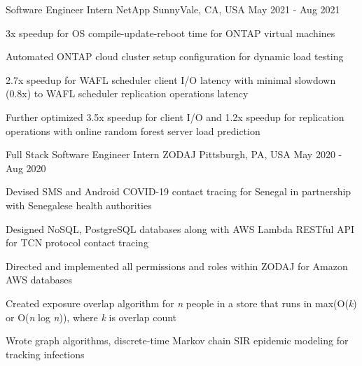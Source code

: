 

\begin{cventries}

  \cventry
    {Software Engineer Intern} %
    {NetApp} %
    {SunnyVale, CA, USA} %
    {May 2021 - Aug 2021} %
    {
      \begin{cvitems} %
        \item {3x speedup for OS compile-update-reboot time for ONTAP virtual machines}
        \item {Automated ONTAP cloud cluster setup configuration for dynamic load testing}
        \item {2.7x speedup for WAFL scheduler client I/O latency with minimal slowdown (0.8x) to WAFL scheduler replication operations latency}
        \item {Further optimized 3.5x speedup for client I/O and 1.2x speedup for replication operations with online random forest server load prediction}
      \end{cvitems}
    }

  \cventry
    {Full Stack Software Engineer Intern} %
    {ZODAJ} %
    {Pittsburgh, PA, USA} %
    {May 2020 - Aug 2020} %
    {
      \begin{cvitems} %
        \item {Devised SMS and Android COVID-19 contact tracing for Senegal in partnership with Senegalese health authorities}
        \item {Designed NoSQL, PostgreSQL databases along with AWS Lambda RESTful API for TCN protocol contact tracing}
        \item {Directed and implemented all permissions and roles within ZODAJ for Amazon AWS databases}
        \item {Created exposure overlap algorithm for \textit{n} people in a store that runs in max(O(\textit{k}) or O(\textit{n} log \textit{n})), where \textit{k} is overlap count}
        \item {Wrote graph algorithms, discrete-time Markov chain SIR epidemic modeling for tracking infections}
      \end{cvitems}
    }


\end{cventries}
